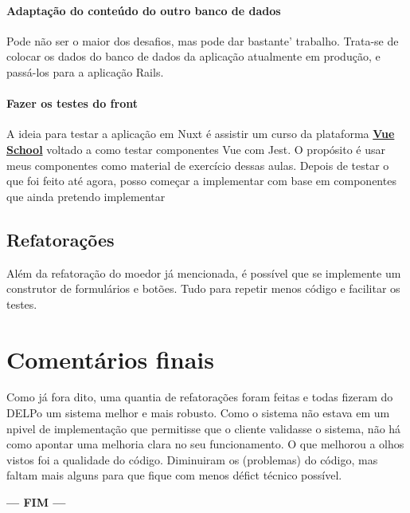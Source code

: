 \paragraph{Adaptação do conteúdo do outro banco de dados} Pode não ser o maior dos desafios, mas pode dar bastante'
trabalho. Trata-se de colocar os dados do banco de dados da aplicação atualmente em produção, e passá-los para a
aplicação Rails.

\paragraph{Fazer os testes do front} A ideia para testar a aplicação em Nuxt é assistir um curso da plataforma
\href{https://vueschool.io/}{\textbf{Vue School}} voltado a como testar componentes Vue com Jest. O propósito é usar meus
componentes como material de exercício dessas aulas. Depois de testar o que foi feito até agora, posso começar a
implementar com base em componentes que ainda pretendo implementar

\subsection{Refatorações}\label{subsec:refatoracoes}

Além da refatoração do moedor já mencionada, é possível que se implemente um construtor de formulários e botões. Tudo
para repetir menos código e facilitar os testes.

\section{Comentários finais} \label{sec:botton-line}

Como já fora dito, uma quantia de refatorações foram feitas e todas fizeram do DELPo um sistema melhor e mais 
robusto. Como o sistema não estava em um npivel de implementação que permitisse que o cliente validasse o
sistema, não há como apontar uma melhoria clara no seu funcionamento. O que melhorou a olhos vistos foi a
qualidade do código. Diminuiram os  (problemas) do código, mas faltam mais alguns para que fique
com menos défict técnico possível.

{\LARGE
  \vfill
  \begin{center}
    \textbf{--- FIM ---}
  \end{center}
}

